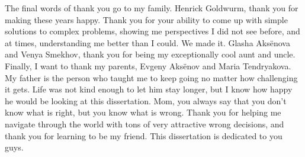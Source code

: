 {The final words of thank you go to my family.
Henrick Goldwurm, thank you for making these years happy.
Thank you for your ability to come up with simple solutions to complex problems, showing me perspectives I did not see before, and at times, understanding me better than I could.
We made it.
Glasha Aks\"{e}nova and Venya Smekhov, thank you for being my exceptionally cool aunt and uncle.
Finally, I want to thank my parents, Evgeny Aks\"{e}nov and Maria Tendryakova.
My father is the person who taught me to keep going no matter how challenging it gets.
Life was not kind enough to let him stay longer, but I know how happy he would be looking at this dissertation.
Mom, you always say that you don't know what is right, but you know what is wrong.
Thank you for helping me navigate through the world with tons of very attractive wrong decisions, and thank you for learning to be my friend.
This dissertation is dedicated to you guys.
}